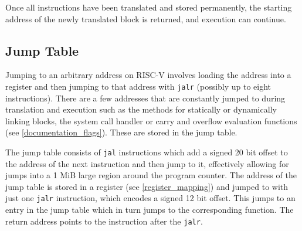 	\noindent Once all instructions have been translated and stored permanently, the starting address of the newly translated block is returned, and execution can continue.

\subsection{Jump Table}
	\label{Jump Table}
	Jumping to an arbitrary address on RISC-V involves loading the address into a register and then jumping to that address with \texttt{jalr} (possibly up to eight instructions). There are a few addresses that are constantly jumped to during translation and execution such as the methods for statically or dynamically linking blocks, the system call handler or carry and overflow evaluation functions (see \ref{documentation_flags}). These are stored in the jump table.

	The jump table consists of \texttt{jal} instructions which add a signed 20 bit offset to the address of the next instruction and then jump to it, effectively allowing for jumps into a 1 MiB large region around the program counter. The address of the jump table is stored in a register (see \ref{register_mapping}) and jumped to with just one \texttt{jalr} instruction, which encodes a signed 12 bit offset. This jumps to an entry in the jump table which in turn jumps to the corresponding function. The return address points to the instruction after the \texttt{jalr}.

